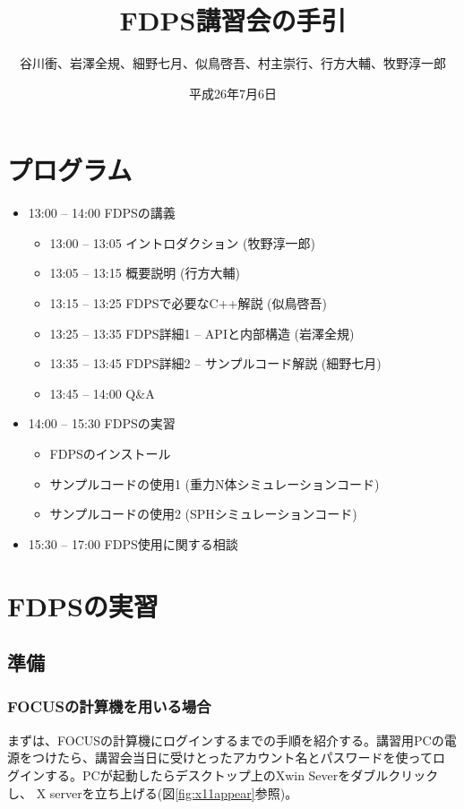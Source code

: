 \documentclass[12pt,a4paper,dvipdfmx]{jarticle}
\title{FDPS講習会の手引}
\author{谷川衝、岩澤全規、細野七月、似鳥啓吾、村主崇行、行方大輔、牧野淳一郎}
\date{平成26年7月6日}
\begin{document}
\maketitle
\tableofcontents

\newpage

\section{プログラム}

\begin{itemize}

\item 13:00 -- 14:00 FDPSの講義
  \begin{itemize}
  \item 13:00 -- 13:05 イントロダクション (牧野淳一郎)
  \item 13:05 -- 13:15 概要説明 (行方大輔)
  \item 13:15 -- 13:25 FDPSで必要なC++解説 (似鳥啓吾)
  \item 13:25 -- 13:35 FDPS詳細1 -- APIと内部構造 (岩澤全規)
  \item 13:35 -- 13:45 FDPS詳細2 -- サンプルコード解説 (細野七月)
  \item 13:45 -- 14:00 Q\&A
  \end{itemize}

\item 14:00 -- 15:30 FDPSの実習
  \begin{itemize}
  \item FDPSのインストール
  \item サンプルコードの使用1 (重力N体シミュレーションコード)
  \item サンプルコードの使用2 (SPHシミュレーションコード)
  \end{itemize}

\item 15:30 -- 17:00 FDPS使用に関する相談

\end{itemize}

\newpage

\section{FDPSの実習}

\subsection{準備}

\subsubsection{FOCUSの計算機を用いる場合}
まずは、FOCUSの計算機にログインするまでの手順を紹介する。講習用PCの電
源をつけたら、講習会当日に受けとったアカウント名とパスワードを使ってロ
グインする。PCが起動したらデスクトップ上のXwin Severをダブルクリックし、
X serverを立ち上げる(図\ref{fig:x11appear}参照)。
\end{document}
